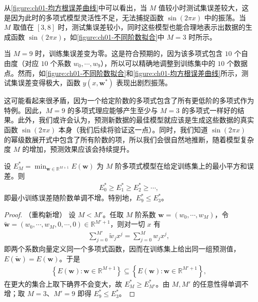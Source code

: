 \documentclass[../../main.tex]{subfiles}
\begin{document}
从\cref{figure:ch01-均方根误差曲线}中可以看出，当 $M$ 值较小时测试集误差较大，这是因为此时的多项式模型灵活性不足，无法捕捉函数 $\sin(2\pi x)$ 中的振荡。当 $M$ 取值在 $[3,8]$ 时，测试集误差较小，同时这些模型也能合理地表示出数据的生成函数 $\sin(2\pi x)$，如\cref{figure:ch01-不同阶数拟合}中 $M=3$ 时所示。

当 $M=9$ 时，训练集误差变为零。这是符合预期的，因为该多项式包含 $10$ 个自由度（对应 $10$ 个系数 $w_0,\cdots,w_9$），所以可以精确地调整到训练集中的 $10$ 个数据点。然而，如\cref{figure:ch01-不同阶数拟合}和\cref{figure:ch01-均方根误差曲线}所示，测试集误差变得极大，函数 $y(x,\mathbf{w}^{*})$ 表现出剧烈振荡。

这可能看起来很矛盾，因为一个给定阶数的多项式包含了所有更低阶的多项式作为特例。因此，$M=9$ 的多项式理应能够产生至少与 $M=3$ 的多项式一样好的结果。此外，我们或许会认为，预测新数据的最佳模型就应该是生成这些数据的真实函数 $\sin(2\pi x)$ 本身（我们后续将验证这一点）。同时，我们知道 $\sin(2\pi x)$ 的幂级数展开式中包含了所有阶数的项，所以我们会很自然地推断，随着模型复杂度 $M$ 的增加，预测效果应该会持续提升。

\begin{proposition}[训练误差随阶数单调不增]\label{proposition:ch01-训练误差单调性}
设 $E_{M}^{*}=\min_{\mathbf{w}\in\mathbb{R}^{M+1}}E(\mathbf{w})$ 为 $M$ 阶多项式模型在给定训练集上的最小平方和误差。则
\begin{align*}
  E_{0}^{*} \geqslant E_{1}^{*} \geqslant E_{2}^{*} \geqslant \cdots,
\end{align*}
即最小训练误差随阶数单调不增。特别地，$E_{9}^{*}\leqslant E_{3}^{*}$。
\end{proposition}

\begin{proof}（重构新增）
设 $M<M'$。任取 $M$ 阶系数 $\mathbf{w}=(w_0,\cdots,w_M)$，令 $\tilde{\mathbf{w}}=(w_0,\cdots,w_M,0,\cdots,0)\in\mathbb{R}^{M'+1}$，则对一切 $x$ 有
\begin{align*}
  \sum_{j=0}^{M'} \tilde{w}_j x^{j} = \sum_{j=0}^{M} w_j x^{j},
\end{align*}
即两个系数向量定义同一个多项式函数，因而在训练集上给出同一组预测值，$E(\tilde{\mathbf{w}})=E(\mathbf{w})$。于是
\begin{align*}
  \left\{E(\mathbf{w}) : \mathbf{w}\in\mathbb{R}^{M+1}\right\} \subseteq \left\{E(\mathbf{w}) : \mathbf{w}\in\mathbb{R}^{M'+1}\right\},
\end{align*}
在更大的集合上取下确界不会变大，故 $E_{M}^{*}\geqslant E_{M'}^{*}$。由 $M,M'$ 的任意性得单调不增；取 $M=3$、$M'=9$ 即得 $E_{9}^{*}\leqslant E_{3}^{*}$。
\end{proof}
\end{document}
